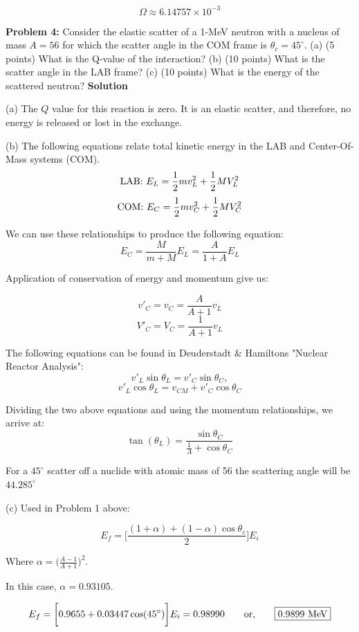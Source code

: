 \documentclass{amsart}
\theoremstyle{definition}
\begin{document}
$$ \boxed{\Omega \approx 6.14757 \times 10^{-3}}  $$
 
 
\newpage 
\textbf{Problem 4:} Consider the elastic scatter of a 1-MeV neutron with a nucleus of mass $ A=56$ for which the scatter angle in the COM frame is $\theta_c = 45^\circ$. \newline
(a) (5 points) What is the Q-value of the interaction? \newline
(b) (10 points) What is the scatter angle in the LAB frame? \newline
(c) (10 points) What is the energy of the scattered neutron? \newline
\textbf{Solution}


 
(a)
The $Q$ value for this reaction is zero.
It is an elastic scatter, and therefore, no energy is released or lost in the exchange.



(b)
The following equations relate total kinetic energy in the LAB and Center-Of-Mass systems (COM).
$$  \textnormal{LAB:  }E_L = \frac{1}{2} m v_L^2 + \frac{1}{2} M V_L^2  $$
$$  \textnormal{COM:  }E_C = \frac{1}{2} m v_C^2 + \frac{1}{2} M V_C^2  $$


We can use these relationships to produce the following equation:
$$ E_C = \frac{M}{m+M}E_L = \frac{A}{1+A}E_L $$


Application of conservation of energy and momentum give us:

$$ v'_C = v_C = \frac{A}{A+1} v_L  $$
$$ V'_C = V_C = \frac{1}{A+1} v_L $$


The following equations can be found in Deuderstadt \& Hamiltons "Nuclear Reactor Analysis":
$$ v'_L \sin \theta_L  = v'_C \sin \theta_C, $$
$$ v'_L \cos \theta_L  = v_{CM} + v'_C \cos \theta_C $$


Dividing the two above equations and using the momentum relationships, we arrive at:
$$ \tan(\theta_L) = \frac{\sin \theta_C}{\frac{1}{A} + \cos \theta_C} $$


For a $45^\circ$ scatter off a nuclide with atomic mass of 56 the scattering angle will be $\boxed{44.285^\circ}$




(c)
Used in Problem 1 above:

$$ E_f = \bigg[ \frac{(1+\alpha)+(1-\alpha) \cos \theta_c}{2} \bigg] E_i $$


Where $\alpha = \big( \frac{A-1}{A+1} \big)^2$.

In this case, $\alpha = 0.93105$.

$$ E_f = \bigg[ 0.9655 + 0.03447\cos(45^\circ) \bigg] E_i = 0.98990 \qquad \textnormal{or,} \qquad \boxed{0.9899 \textnormal{ MeV}} $$
\end{document}
